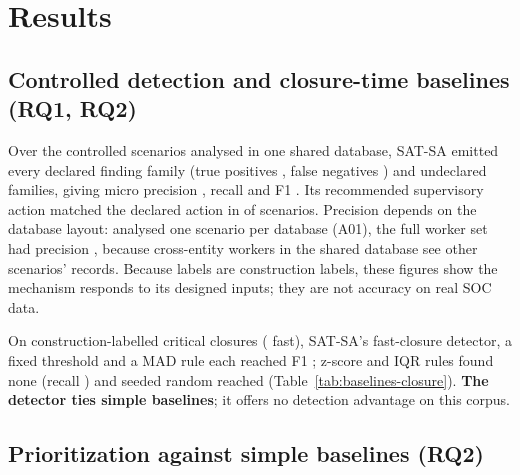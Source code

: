 \section{Results}
\label{sec:results}

\subsection{Controlled detection and closure-time baselines (RQ1, RQ2)}

Over the  controlled scenarios analysed in one shared database,
SAT-SA emitted every declared finding family (true positives , false negatives ) and
 undeclared families, giving micro precision , recall
 and F1 . Its recommended supervisory action matched the
declared action in  of  scenarios. Precision
depends on the database layout: analysed one scenario per database (A01), the full
worker set had precision , because cross-entity workers in the
shared database see other scenarios' records. Because labels are construction
labels, these figures show the mechanism responds to its designed inputs; they
are not accuracy on real SOC data.

On  construction-labelled critical closures
( fast), SAT-SA's fast-closure detector, a fixed threshold and a
MAD rule each reached F1 ; z-score and IQR rules found none
(recall ) and seeded random reached
 (Table~\ref{tab:baselines-closure}). \textbf{The detector
ties simple baselines}; it offers no detection advantage on this corpus.



\subsection{Prioritization against simple baselines (RQ2)}

